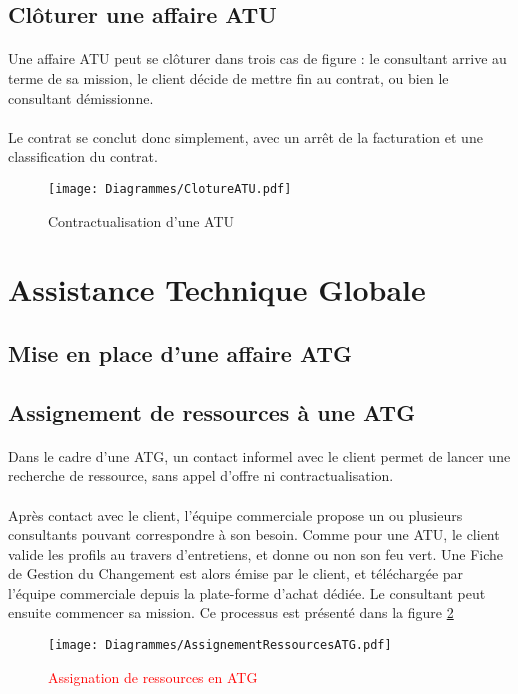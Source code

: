 \subsection{Clôturer une affaire ATU}

\paragraph{} Une affaire ATU peut se clôturer dans trois cas de figure : le consultant arrive au terme de sa mission, le client décide de mettre fin au contrat, ou bien 
le consultant démissionne.
\paragraph{} Le contrat se conclut donc simplement, avec un arrêt de la facturation et une classification du contrat.

\begin{figure}[H]
	\centering
	\texttt{[image: Diagrammes/ClotureATU.pdf]}
	\caption{Contractualisation d'une ATU} 
	\label{contractATU}
\end{figure}




\section{Assistance Technique Globale}

\subsection{Mise en place d'une affaire ATG}

\subsection{Assignement de ressources à une ATG}

\paragraph{} Dans le cadre d'une ATG, un contact informel avec le client permet de lancer une recherche de ressource, sans appel d'offre ni contractualisation.
\paragraph{}Après contact avec le client, l'équipe commerciale propose un ou plusieurs consultants pouvant correspondre à son besoin. Comme pour une ATU, le client valide les profils au travers d'entretiens, et donne ou non son feu vert. Une Fiche de Gestion du Changement est alors émise par le client, et téléchargée par l'équipe commerciale depuis la plate-forme d'achat dédiée. Le consultant peut ensuite commencer sa mission.
Ce processus est présenté dans la figure \ref{asgtRcesATG}



\begin{figure}[H]
	\centering
	\texttt{[image: Diagrammes/AssignementRessourcesATG.pdf]}
	\caption{\textcolor{red}{Assignation de ressources en ATG}} 
	\label{asgtRcesATG}
\end{figure}


